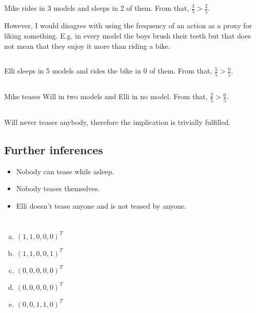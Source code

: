 \documentclass{article}
\begin{document}
Mike rides in 3 models and sleeps in 2 of them. From that, $\frac{3}{5} > \frac{2}{5}$.

However, I would disagree with using the frequency of an action as a proxy for liking something. E.g. in every model the boys brush their teeth but that does not mean that they enjoy it more than riding a bike.

\subsection{}

Elli sleeps in 5 models and rides the bike in 0 of them. From that, $\frac{5}{5} > \frac{0}{5}$.

\subsection{}

Mike teases Will in two models and Elli in no model. From that, $\frac{2}{5} > \frac{0}{5}$.

\subsection{}

Will never teases anybody, therefore the implication is trivially fulfilled.

\subsection*{Further inferences}

\begin{itemize}
\item Nobody can tease while asleep.
\item Nobody teases themselves.
\item Elli doesn't tease anyone and is not teased by anyone.
\end{itemize}

\clearpage

\section{}

\begin{enumerate}[a)]
\item $(1,1,0,0,0)^T$
\item $(1,1,0,0,1)^T$
\item $(0,0,0,0,0)^T$
\item $(0,0,0,0,0)^T$
\item $(0,0,1,1,0)^T$
\end{enumerate}
\end{document}
